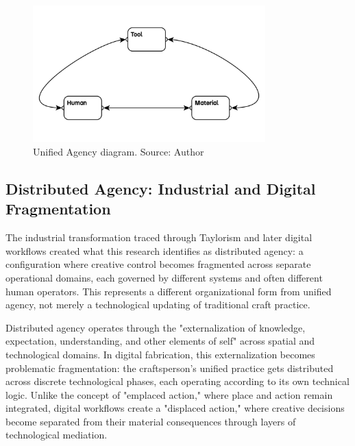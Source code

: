 \begin{figure}[h]
\centering
\includegraphics[width=0.8\textwidth]{figures/chapter1/traditional making.png}
\caption{Unified Agency diagram. Source: Author}
\label{fig:unified_agency}
\end{figure}

\subsection{Distributed Agency: Industrial and Digital Fragmentation}

The industrial transformation traced through Taylorism and later digital workflows created what this research identifies as distributed agency: a configuration where creative control becomes fragmented across separate operational domains, each governed by different systems and often different human operators. This represents a different organizational form from unified agency, not merely a technological updating of traditional craft practice.

Distributed agency operates through the "externalization of knowledge, expectation, understanding, and other elements of self" across spatial and technological domains. In digital fabrication, this externalization becomes problematic fragmentation: the craftsperson's unified practice gets distributed across discrete technological phases, each operating according to its own technical logic. Unlike the concept of "emplaced action," where place and action remain integrated, digital workflows create a "displaced action," where creative decisions become separated from their material consequences through layers of technological mediation.

